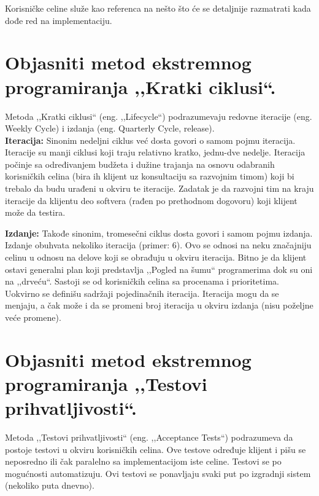 \documentclass[a4paper]{article}
\begin{document}
  Korisničke celine služe kao referenca na nešto što će se detaljnije razmatrati kada dođe red
  na implementaciju. 

\section{Objasniti metod ekstremnog programiranja ,,Kratki ciklusi``.}
  Metoda ,,Kratki ciklusi`` (eng. ,,Lifecycle``) podrazumevaju redovne iteracije (eng. Weekly Cycle) i 
  izdanja (eng. Quarterly Cycle, release).\\
  
  \textbf{Iteracija:} Sinonim nedeljni ciklus već dosta govori o samom pojmu iteracija.
  Iteracije su manji ciklusi koji traju relativno kratko, jednu-dve nedelje. 
  Iteracija počinje sa određivanjem budžeta i dužine trajanja na osnovu odabranih
  korisničkih celina (bira ih klijent uz konsultaciju sa razvojnim timom) koji bi trebalo 
  da budu urađeni u okviru te iteracije. Zadatak je da razvojni tim na kraju iteracije
  da klijentu deo softvera (rađen po prethodnom dogovoru) koji klijent može da testira.

  \textbf{Izdanje:} Takođe sinonim, tromesečni ciklus dosta govori i samom pojmu izdanja.
  Izdanje obuhvata nekoliko iteracija (primer: 6). Ovo se odnosi na neku značajniju celinu
  u odnosu na delove koji se obrađuju u okviru iteracija. Bitno je da klijent ostavi generalni
  plan koji predstavlja ,,Pogled na šumu`` programerima dok su oni na ,,drveću``. Sastoji 
  se od korisničkih celina sa procenama i prioritetima. Uokvirno se definišu sadržaji pojedinačnih 
  iteracija. Iteracija mogu da se menjaju, a čak može i da se promeni broj iteracija u okviru 
  izdanja (nisu poželjne veće promene). 
  
\section{Objasniti metod ekstremnog programiranja ,,Testovi prihvatljivosti``.}
  Metoda ,,Testovi prihvatljivosti`` (eng. ,,Acceptance Tests``) podrazumeva 
  da postoje testovi u okviru korisničkih celina. Ove testove određuje klijent i pišu se 
  neposredno ili čak paralelno sa implementacijom iste celine. Testovi se po mogućnosti automatizuju. 
  Ovi testovi se ponavljaju svaki put po izgradnji sistem (nekoliko puta dnevno).
  \cite{xporg_acceptance_tests}
\end{document}

